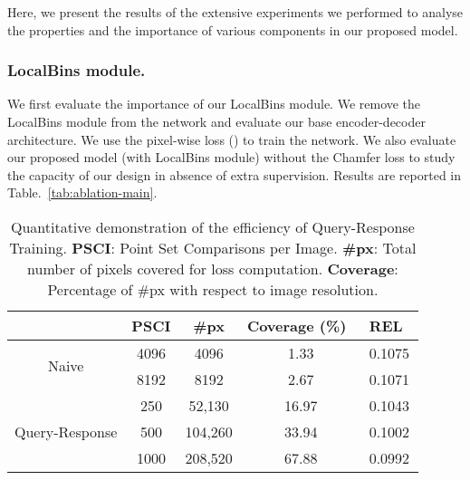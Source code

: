 \documentclass[runningheads]{llncs}
\begin{document}
Here, we present the results of the extensive experiments we performed to analyse the properties and the importance of various components in our proposed model. 

\subsubsection{LocalBins module.}
We first evaluate the importance of our LocalBins module. We remove the LocalBins module from the network and evaluate our base encoder-decoder architecture. We use the pixel-wise loss () to train the network. We also evaluate our proposed model (with LocalBins module) without the Chamfer loss to study the capacity of our design in absence of extra supervision. Results are reported in Table.~\ref{tab:ablation-main}. 


\begin{table}[t]
\centering
\begin{tabular}{@{}c|cc|cl@{}}
\toprule
\multicolumn{1}{l}{}            & PSCI & \#px & \textbf{Coverage (\%)}~ & \textbf{REL}~    \\ \midrule
\multirow{2}{*}{Naive}          & 4096 & 4096           & 1.33     & 0.1075 \\
                                & 8192 & 8192           & 2.67     & 0.1071 \\ \midrule
\multirow{3}{*}{Query-Response} & 250  & 52,130         & 16.97    & 0.1043 \\
                                & 500  & 104,260        & 33.94    & 0.1002 \\
                                & 1000 & 208,520        & 67.88    & 0.0992  \\ \bottomrule
\end{tabular}
\caption{Quantitative demonstration of the efficiency of Query-Response Training. \textbf{PSCI}: Point Set Comparisons per Image. \textbf{\#px}: Total number of pixels covered for loss computation. \textbf{Coverage}: Percentage of \#px with respect to image resolution.}
\label{tab:coverage}
\end{table}
\end{document}
